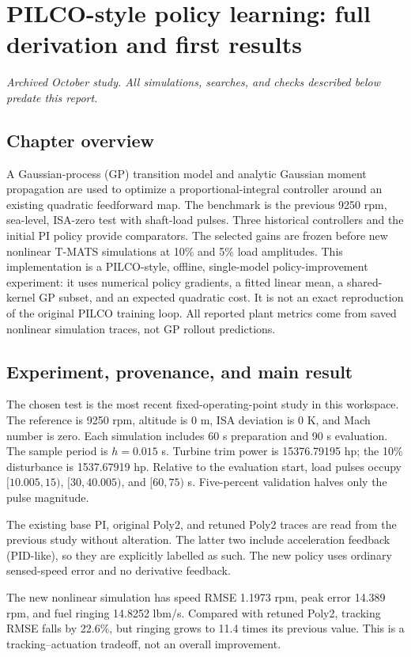 \chapter{PILCO-style policy learning: full derivation and first results}
\textit{Archived October study. All simulations, searches, and checks described below predate this report.}\par

\section*{Chapter overview}
A Gaussian-process (GP) transition model and analytic Gaussian moment propagation are used to optimize a proportional-integral controller around an existing quadratic feedforward map. The benchmark is the previous 9250 rpm, sea-level, ISA-zero test with shaft-load pulses. Three historical controllers and the initial PI policy provide comparators. The selected gains are frozen before new nonlinear T-MATS simulations at 10\% and 5\% load amplitudes. This implementation is a PILCO-style, offline, single-model policy-improvement experiment: it uses numerical policy gradients, a fitted linear mean, a shared-kernel GP subset, and an expected quadratic cost. It is not an exact reproduction of the original PILCO training loop. All reported plant metrics come from saved nonlinear simulation traces, not GP rollout predictions.

\section{Experiment, provenance, and main result}
The chosen test is the most recent fixed-operating-point study in this workspace. The reference is 9250 rpm, altitude is 0 m, ISA deviation is 0 K, and Mach number is zero. Each simulation includes 60 s preparation and 90 s evaluation. The sample period is $h=0.015$ s. Turbine trim power is 15376.79195 hp; the 10\% disturbance is 1537.67919 hp. Relative to the evaluation start, load pulses occupy $[10.005,15)$, $[30,40.005)$, and $[60,75)$ s. Five-percent validation halves only the pulse magnitude.

The existing base PI, original Poly2, and retuned Poly2 traces are read from the previous study without alteration. The latter two include acceleration feedback (PID-like), so they are explicitly labelled as such. The new policy uses ordinary sensed-speed error and no derivative feedback.

The new nonlinear simulation has speed RMSE 1.1973 rpm, peak error 14.389 rpm, and fuel ringing 14.8252 lbm/s. Compared with retuned Poly2, tracking RMSE falls by 22.6\%, but ringing grows to 11.4 times its previous value. This is a tracking--actuation tradeoff, not an overall improvement.

